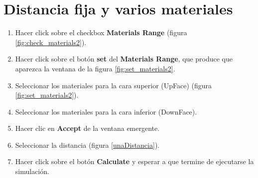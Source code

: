 	\section{Distancia fija y varios materiales}
	\begin{enumerate}
			\item Hacer click sobre el checkbox \textbf{Materials Range} (figura \ref{fig:check_materials2}).
			\item Hacer click sobre el botón \textbf{set} del \textbf{Materials Range}, que produce que aparezca la ventana de la figura \ref{fig:set_materials2}.
			\item Seleccionar los materiales para la cara superior (UpFace) (figura \ref{fig:set_materials2}).
			\item Seleccionar los materiales para la cara inferior (DownFace).
			\item Hacer clic en \textbf{Accept} de la ventana emergente.
			\item Seleccionar la distancia (figura \ref{unaDistancia}). 
			\item Hacer click sobre el botón \textbf{Calculate} y esperar a que termine de ejecutarse la simulación.
	\end{enumerate}
